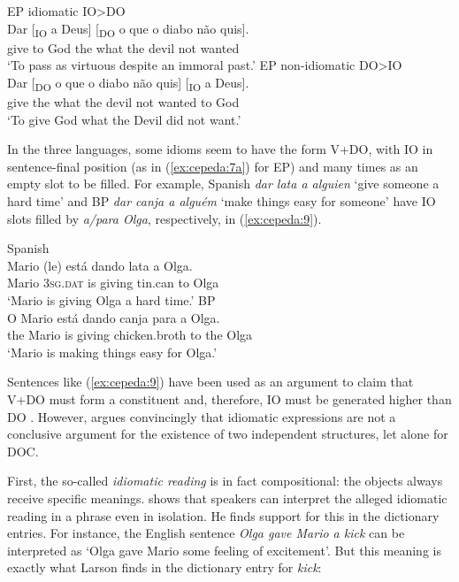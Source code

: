 \documentclass[output=paper,colorlinks,citecolor=brown,modfonts,nonflat]{langsci/langscibook}
\begin{document}
\ea%
    \label{ex:cepeda:8}
	\ea\label{ex:cepeda:8a}
	EP idiomatic IO>DO\\
	\gll Dar [\textsubscript{IO} a  Deus] [\textsubscript{DO} o que o diabo não quis].\\
		give \hspaceThis{[\textsubscript{IO}} to God \hspaceThis{[\textsubscript{DO}} the what the devil  not  wanted\\
	\glt ‘To pass as virtuous despite an immoral past.’
	\ex\label{ex:cepeda:8b}
	EP non-idiomatic DO>IO\\
	\gll Dar [\textsubscript{DO} o que o diabo não quis] [\textsubscript{IO} a  Deus]. \\
		give \hspaceThis{[\textsubscript{DO}} the what the devil  not  wanted \hspaceThis{[\textsubscript{IO}} to God\\
	\glt ‘To give God what the Devil did not want.’
	\z
\z

In the three languages, some idioms seem to have the form V+DO, with IO in sentence-final position (as in (\ref{ex:cepeda:7a}) for EP) and many times as an empty slot to be filled. For example, Spanish \textit{dar lata a alguien} ‘give someone a hard time’ and BP \textit{dar canja a alguém} ‘make things easy for someone’ have IO slots filled by \textit{a/para Olga}, respectively, in (\ref{ex:cepeda:9}).

\ea%
    \label{ex:cepeda:9}
	\ea\label{ex:cepeda:9a}
	Spanish\\
	\gll Mario (le) está dando lata a  Olga.\\
		Mario \textsc{3sg.dat} is giving tin.can to Olga\\
	\glt ‘Mario is giving Olga a hard time.’
	\ex\label{ex:cepeda:9b}
	BP\\
	\gll O Mario está dando canja para a Olga.\\
		the Mario is    giving chicken.broth  to   the Olga\\
	\glt ‘Mario is making things easy for Olga.’
	\z
\z

Sentences like (\ref{ex:cepeda:9}) have been used as an argument to claim that V+DO must form a constituent and, therefore, IO must be generated higher than DO \citep{Bleam2003}. However, \citet{Larson2014,Larson2017} argues convincingly that idiomatic expressions are not a conclusive argument for the existence of two independent structures, let alone for DOC.

First, the so-called \textit{idiomatic reading} is in fact compositional: the objects always receive specific meanings. \citet{Larson2017} shows that speakers can interpret the alleged idiomatic reading in a phrase even in isolation. He finds support for this in the dictionary entries. For instance, the English sentence \textit{Olga gave Mario a kick} can be interpreted as ‘Olga gave Mario some feeling of excitement’. But this meaning is exactly what Larson finds in the dictionary entry for \textit{kick}:
\end{document}
